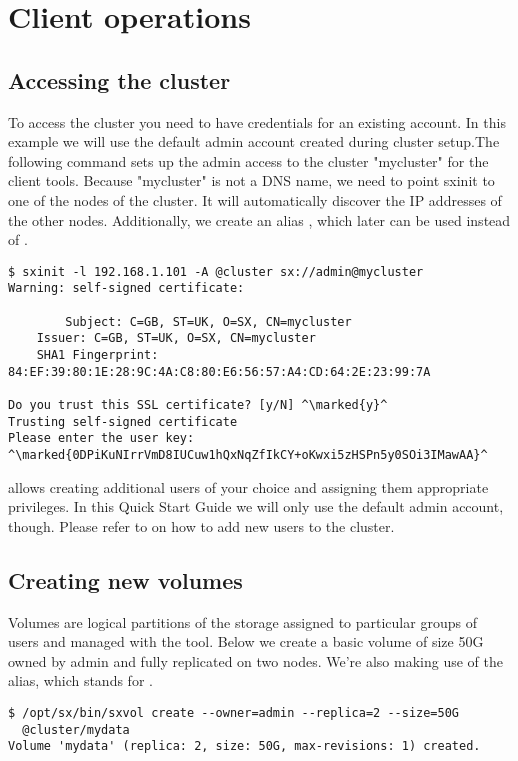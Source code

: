 \chapter{Client operations}

\section*{Accessing the cluster}
To access the cluster you need to have credentials for an existing
account. In this example we will use the default admin account created
during cluster setup.The following command sets up the admin access to
the \SX cluster "mycluster" for the client tools. Because "mycluster"
is not a DNS name, we need to point sxinit to one of the nodes of the
cluster. It will automatically discover the IP addresses of the other
nodes. Additionally, we create an alias , which later
can be used instead of .
\small
\begin{lstlisting}
$ sxinit -l 192.168.1.101 -A @cluster sx://admin@mycluster
Warning: self-signed certificate:

        Subject: C=GB, ST=UK, O=SX, CN=mycluster
	Issuer: C=GB, ST=UK, O=SX, CN=mycluster
	SHA1 Fingerprint: 84:EF:39:80:1E:28:9C:4A:C8:80:E6:56:57:A4:CD:64:2E:23:99:7A

Do you trust this SSL certificate? [y/N] ^\marked{y}^
Trusting self-signed certificate
Please enter the user key:
^\marked{0DPiKuNIrrVmD8IUCuw1hQxNqZfIkCY+oKwxi5zHSPn5y0SOi3IMawAA}^
\end{lstlisting}

\LARGE
\SX allows creating additional users of your choice and assigning them
appropriate privileges. In this Quick Start Guide we will only use the
default admin account, though. Please refer to 
on how to add new users to the cluster.

\section*{Creating new volumes}
Volumes are logical partitions of the \SX storage assigned to particular
groups of users and managed with the  tool. Below we create
a basic volume of size 50G owned by admin and fully replicated on two nodes.
We're also making use of the  alias, which stands for .
\small
\begin{lstlisting}
$ /opt/sx/bin/sxvol create --owner=admin --replica=2 --size=50G
  @cluster/mydata
Volume 'mydata' (replica: 2, size: 50G, max-revisions: 1) created.
\end{lstlisting}
\LARGE

